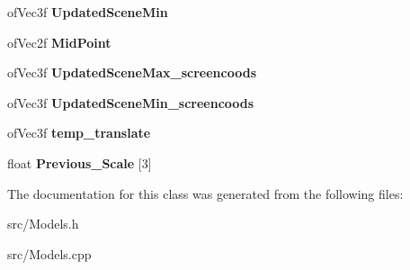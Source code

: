 \begin{DoxyCompactItemize}
\item 
\hypertarget{class_models_a799f8ef19589c6531f370fa8de6265a5}{of\-Vec3f {\bfseries Updated\-Scene\-Min}}\label{class_models_a799f8ef19589c6531f370fa8de6265a5}

\item 
\hypertarget{class_models_a644a4cf3266f40d65ca50e3ea660c523}{of\-Vec2f {\bfseries Mid\-Point}}\label{class_models_a644a4cf3266f40d65ca50e3ea660c523}

\item 
\hypertarget{class_models_aa5e2e9369a10579ea65c401cc656c4d2}{of\-Vec3f {\bfseries Updated\-Scene\-Max\-\_\-screencoods}}\label{class_models_aa5e2e9369a10579ea65c401cc656c4d2}

\item 
\hypertarget{class_models_aee6eafadecdad479a74c8d7615448c36}{of\-Vec3f {\bfseries Updated\-Scene\-Min\-\_\-screencoods}}\label{class_models_aee6eafadecdad479a74c8d7615448c36}

\item 
\hypertarget{class_models_adbb58bd908bd175c0497e5f260cbb67a}{of\-Vec3f {\bfseries temp\-\_\-translate}}\label{class_models_adbb58bd908bd175c0497e5f260cbb67a}

\item 
\hypertarget{class_models_a8d8271cf0fea4ee10493613fdb4494cd}{float {\bfseries Previous\-\_\-\-Scale} \mbox{[}3\mbox{]}}\label{class_models_a8d8271cf0fea4ee10493613fdb4494cd}

\end{DoxyCompactItemize}


The documentation for this class was generated from the following files\-:\begin{DoxyCompactItemize}
\item 
src/Models.\-h\item 
src/Models.\-cpp\end{DoxyCompactItemize}
